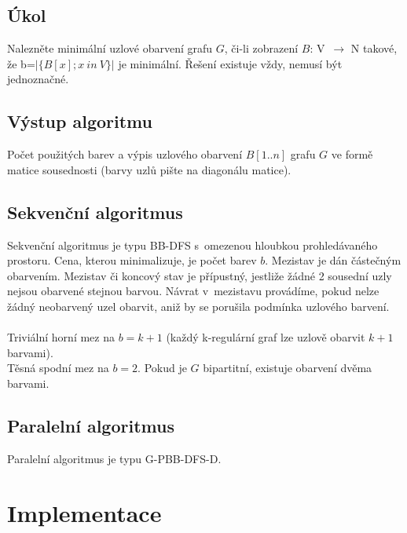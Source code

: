\documentclass[12pt]{article}
\begin{document}
\subsection{Úkol} 

Nalezněte minimální uzlové obarvení grafu $G$, či-li zobrazení $B$: V~$\rightarrow$ N takové, že b=$\left|\{B[x]; x\ in\ V\}\right|$ je minimální. Řešení existuje vždy, nemusí být jednoznačné.

\subsection{Výstup algoritmu}

Počet použitých barev a výpis uzlového obarvení $B[1..n]$ grafu $G$ ve formě matice sousednosti (barvy uzlů pište na diagonálu matice).\\

\subsection{Sekvenční algoritmus}

Sekvenční algoritmus je typu BB-DFS s~omezenou hloubkou prohledávaného prostoru. Cena, kterou minimalizuje, je počet barev $b$. Mezistav je dán částečným obarvením. Mezistav či koncový stav je přípustný, jestliže žádné 2 sousední uzly nejsou obarvené stejnou barvou. Návrat v~mezistavu provádíme, pokud nelze žádný neobarvený uzel obarvit, aniž by se porušila podmínka uzlového barvení.\\
\\
Triviální horní mez na $b=k+1$ (každý k-regulární graf lze uzlově obarvit $k+1$ barvami).\\
Těsná spodní mez na $b=2$. Pokud je $G$ bipartitní, existuje obarvení dvěma barvami.


\subsection{Paralelní algoritmus}

Paralelní algoritmus je typu G-PBB-DFS-D. 

\section{Implementace}
\end{document}

